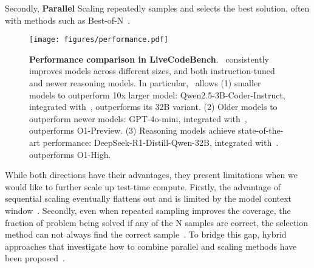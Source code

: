 Secondly, \textbf{Parallel} Scaling repeatedly samples and selects the best solution, often with methods such as Best-of-N~\citep{brown2024large}. 
\begin{figure}[!t]
    \centering
    \texttt{[image: figures/performance.pdf]}      \caption{\textbf{Performance comparison in LiveCodeBench}. ~\frameworkname consistently improves models across different sizes, and both instruction-tuned and newer reasoning models. In particular, ~\frameworkname allows (1) smaller models to outperform 10x larger model: Qwen2.5-3B-Coder-Instruct, integrated with~\frameworkname, outperforms its 32B variant. (2) Older models to outperform newer models: GPT-4o-mini, integrated with~\frameworkname, outperforms O1-Preview. (3) Reasoning models achieve state-of-the-art performance: DeepSeek-R1-Distill-Qwen-32B, integrated with~\frameworkname. outperforms O1-High.}
        \label{fig:performance}
\end{figure}


While both directions have their advantages, they present limitations when we would like to further scale up test-time compute. Firstly, the advantage of sequential scaling eventually flattens out and is limited by the model context window~\citep{muennighoff2025s1}. 
Secondly, even when repeated sampling improves the coverage, the fraction of problem being solved if any of the N samples are correct, the selection method can not always find the correct sample~\citep{brown2024large, stroebl2024inference}. 
To bridge this gap, hybrid approaches that investigate how to combine parallel and scaling methods have been proposed~\citep{muennighoff2025s1, snell2024scaling}.

